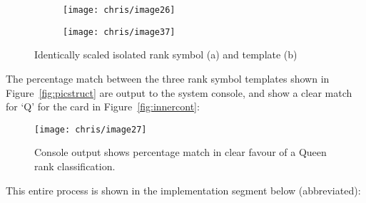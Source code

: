 			\begin{figure}[H]
				\centering
				\begin{subfigure}[b]{0.26\textwidth}
					\centering
					\texttt{[image: chris/image26]}
					\caption{}
				\end{subfigure}
				\begin{subfigure}[b]{0.25\textwidth}
					\centering
					\texttt{[image: chris/image37]}
					\caption{}
				\end{subfigure}
				\caption{Identically scaled isolated rank symbol (a) and template (b)}
				\label{fig:queenstruct}
			\end{figure}

			The percentage match between the three rank symbol templates shown in Figure~\ref{fig:picstruct} are output to the system console, and show a clear match for `Q' for the card in Figure~\ref{fig:innercont}:

			\begin{figure}[H]
				\centering
				\texttt{[image: chris/image27]}
				\caption{Console output shows percentage match in clear favour of a Queen rank classification.}
				\label{fig:console}
			\end{figure}

			This entire process is shown in the implementation segment below (abbreviated):

